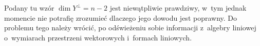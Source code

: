 \documentclass[a4paper,11pt]{article}
\begin{document}
\vspace{\spaceFour}





 Podany tu wzór $\dim Y^{ \perp } = n - 2$ jest niewątpliwie
prawdziwy, w~tym jednak momencie nie potrafię zrozumieć dlaczego jego
dowodu jest poprawny. Do problemu tego należy wrócić, po odświeżeniu sobie
informacji z~algebry liniowej o~wymiarach przestrzeni wektorowych i~formach
liniowych.

\vspace{\spaceFour}




\end{document}
